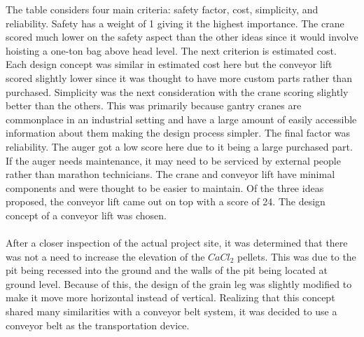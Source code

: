 \documentclass[10pt]{project}
\begin{document}
The table considers four main criteria: safety factor, cost, simplicity, and reliability. Safety has a weight of 1 giving it the highest importance. The crane scored much lower on the safety aspect than the other ideas since it would involve hoisting a one-ton bag above head level. The next criterion is estimated cost. Each design concept was similar in estimated cost here but the conveyor lift scored slightly lower since it was thought to have more custom parts rather than purchased. Simplicity was the next consideration with the crane scoring slightly better than the others. This was primarily because gantry cranes are commonplace in an industrial setting and have a large amount of easily accessible information about them making the design process simpler. The final factor was reliability. The auger got a low score here due to it being a large purchased part. If the auger needs maintenance, it may need to be serviced by external people rather than marathon technicians. The crane and conveyor lift have minimal components and were thought to be easier to maintain. 
Of the three ideas proposed, the conveyor lift came out on top with a score of 24. The design concept of a conveyor lift was chosen.\\\\%
After a closer inspection of the actual project site, it was determined that there was not a need to increase the elevation of the $CaCl_2$ pellets.  This was due to the pit being recessed into the ground and the walls of the pit being located at ground level.  Because of this, the design of the grain leg was slightly modified to make it move more horizontal instead of vertical.  Realizing that this concept shared many similarities with a conveyor belt system, it was decided to use a conveyor belt as the transportation device.
\end{document}
